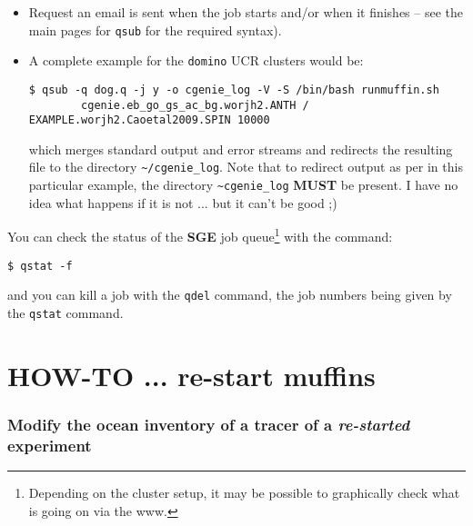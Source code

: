 \documentclass[11pt,fleqn]{book} %
\begin{document}
\begin{itemize}[noitemsep]
        \item Request an email is sent when the job starts and/or when it finishes -- see the main pages for \texttt{qsub} for the required syntax).

        \item A complete example for the \texttt{domino} UCR clusters would be:
\small
        \vspace{-2pt}\begin{verbatim}$ qsub -q dog.q -j y -o cgenie_log -V -S /bin/bash runmuffin.sh
        cgenie.eb_go_gs_ac_bg.worjh2.ANTH / EXAMPLE.worjh2.Caoetal2009.SPIN 10000\end{verbatim}
\normalsize
        which merges standard output and error streams and redirects the resulting file to the directory \texttt{\~{}/cgenie\_log}.
        Note that to redirect output as per in this particular example, the directory \texttt{\~{}cgenie\_log} \textbf{MUST} be present. I have no idea what happens if it is not ... but it can't be good ;)

\end{itemize}

\noindent You can check the status of the \textbf{SGE} job queue\footnote{Depending on the cluster setup, it may be possible to graphically check what is going on via the www.} with the command:
\vspace{-2pt}\begin{verbatim}$ qstat -f\end{verbatim}\vspace{-2pt}
and you can kill a job with the \texttt{qdel} command, the job numbers being given by the \texttt{qstat} command.


\newpage


\section{HOW-TO ... re-start muffins}

%
\subsubsection{Modify the ocean inventory of a tracer of a \textit{re-started} experiment}
\vspace{1mm}
\end{document}
